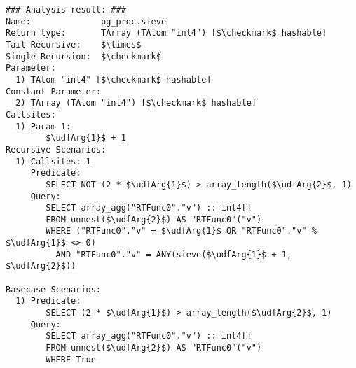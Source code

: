 \begin{lstlisting}[language={},basicstyle=\scriptsize]
### Analysis result: ###
Name:              pg_proc.sieve
Return type:       TArray (TAtom "int4") [$\checkmark$ hashable]
Tail-Recursive:    $\times$
Single-Recursion:  $\checkmark$
Parameter:
  1) TAtom "int4" [$\checkmark$ hashable]
Constant Parameter:
  2) TArray (TAtom "int4") [$\checkmark$ hashable]
Callsites:
  1) Param 1:
        $\udfArg{1}$ + 1
Recursive Scenarios:
  1) Callsites: 1
     Predicate:
        SELECT NOT (2 * $\udfArg{1}$) > array_length($\udfArg{2}$, 1)
     Query:
        SELECT array_agg("RTFunc0"."v") :: int4[]
        FROM unnest($\udfArg{2}$) AS "RTFunc0"("v")
        WHERE ("RTFunc0"."v" = $\udfArg{1}$ OR "RTFunc0"."v" % $\udfArg{1}$ <> 0) 
          AND "RTFunc0"."v" = ANY(sieve($\udfArg{1}$ + 1, $\udfArg{2}$))

Basecase Scenarios:
  1) Predicate:
        SELECT (2 * $\udfArg{1}$) > array_length($\udfArg{2}$, 1)
     Query:
        SELECT array_agg("RTFunc0"."v") :: int4[]        
        FROM unnest($\udfArg{2}$) AS "RTFunc0"("v")
        WHERE True
\end{lstlisting}